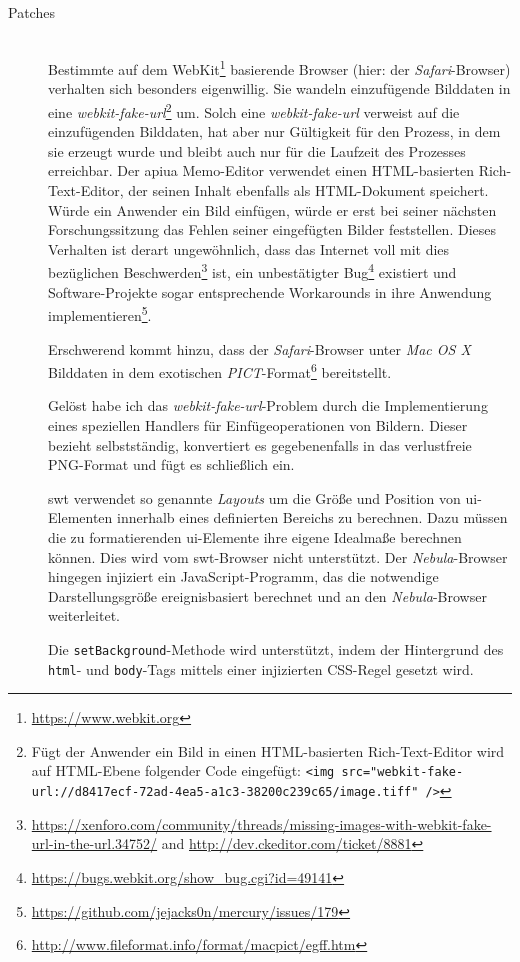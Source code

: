 \begin{description}
  \item[Patches] \hfill \\
  Bestimmte auf dem WebKit\footnote{\url{https://www.webkit.org}} basierende Browser (hier: der \textit{Safari}-Browser) verhalten sich besonders eigenwillig. Sie wandeln einzufügende Bilddaten in eine \textit{webkit-fake-url}\footnote{Fügt der Anwender ein Bild in einen HTML-basierten Rich-Text-Editor wird auf HTML-Ebene folgender Code eingefügt: \texttt{<img src="webkit-fake-url://d8417ecf-72ad-4ea5-a1c3-38200c239c65/image.tiff" />}} um. Solch eine \textit{webkit-fake-url} verweist auf die einzufügenden Bilddaten, hat aber nur Gültigkeit für den Prozess, in dem sie erzeugt wurde und bleibt auch nur für die Laufzeit des Prozesses erreichbar. Der \gls{apiua} Memo-Editor verwendet einen HTML-basierten Rich-Text-Editor, der seinen Inhalt ebenfalls als HTML-Dokument speichert. Würde ein Anwender ein Bild einfügen, würde er erst bei seiner nächsten Forschungssitzung das Fehlen seiner eingefügten Bilder feststellen. Dieses Verhalten ist derart ungewöhnlich, dass das Internet voll mit dies bezüglichen Beschwerden\footnote{\url{https://xenforo.com/community/threads/missing-images-with-webkit-fake-url-in-the-url.34752/} and \url{http://dev.ckeditor.com/ticket/8881}} ist, ein unbestätigter Bug\footnote{\url{https://bugs.webkit.org/show_bug.cgi?id=49141}} existiert und Software-Projekte sogar entsprechende Workarounds in ihre Anwendung implementieren\footnote{\url{https://github.com/jejacks0n/mercury/issues/179}}.
  
  Erschwerend kommt hinzu, dass der \textit{Safari}-Browser unter \textit{Mac OS X} Bilddaten in dem exotischen \textit{PICT}-Format\footnote{\url{http://www.fileformat.info/format/macpict/egff.htm}} bereitstellt.
  
  Gelöst habe ich das \textit{webkit-fake-url}-Problem durch die Implementierung eines speziellen Handlers für Einfügeoperationen von Bildern. Dieser bezieht selbstständig, konvertiert es gegebenenfalls in das verlustfreie PNG-Format und fügt es schließlich ein.
  
  \gls{swt} verwendet so genannte \textit{Layouts} um die Größe und Position von \acrshort{ui}-Elementen innerhalb eines definierten Bereichs zu berechnen. Dazu müssen die zu formatierenden \acrshort{ui}-Elemente ihre eigene Idealmaße berechnen können. Dies wird vom \acrshort{swt}-Browser nicht unterstützt. Der \textit{Nebula}-Browser hingegen injiziert ein JavaScript-Programm, das die notwendige Darstellungsgröße ereignisbasiert berechnet und an den \textit{Nebula}-Browser weiterleitet.
  
  Die \texttt{setBackground}-Methode wird unterstützt, indem der Hintergrund des \texttt{html}- und \texttt{body}-Tags mittels einer injizierten CSS-Regel gesetzt wird.
\end{description}

